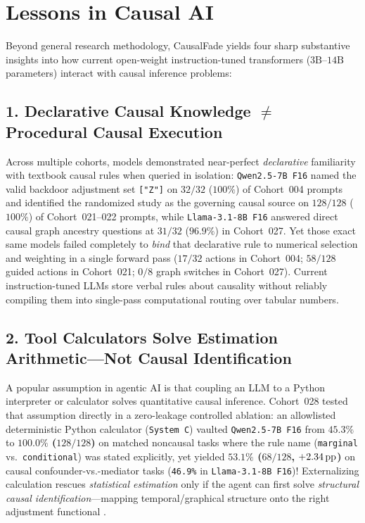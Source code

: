 \chapter{Lessons in Causal AI}\label{ch:lessons_causal_ai}

Beyond general research methodology, CausalFade yields four sharp substantive insights into how current open-weight instruction-tuned transformers ($3\text{B}$--$14\text{B}$ parameters) interact with causal inference problems:

\section{1. Declarative Causal Knowledge $\neq$ Procedural Causal Execution}
Across multiple cohorts, models demonstrated near-perfect \emph{declarative} familiarity with textbook causal rules when queried in isolation: \texttt{Qwen2.5-7B F16} named the valid backdoor adjustment set \texttt{["Z"]} on $32/32$ ($100\%$) of Cohort~004 prompts and identified the randomized study as the governing causal source on $128/128$ ($100\%$) of Cohort~021--022 prompts, while \texttt{Llama-3.1-8B F16} answered direct causal graph ancestry questions at $31/32$ ($96.9\%$) in Cohort~027. Yet those exact same models failed completely to \emph{bind} that declarative rule to numerical selection and weighting in a single forward pass ($17/32$ actions in Cohort~004; $58/128$ guided actions in Cohort~021; $0/8$ graph switches in Cohort~027). Current instruction-tuned LLMs store verbal rules about causality without reliably compiling them into single-pass computational routing over tabular numbers.

\section{2. Tool Calculators Solve Estimation Arithmetic---Not Causal Identification}
A popular assumption in agentic AI is that coupling an LLM to a Python interpreter or calculator solves quantitative causal inference. Cohort~028 tested that assumption directly in a zero-leakage controlled ablation: an allowlisted deterministic Python calculator (\texttt{System C}) vaulted \texttt{Qwen2.5-7B F16} from $45.3\%$ to \textbf{$100.0\%$ ($128/128$)} on matched noncausal tasks where the rule name (\texttt{marginal} vs.\ \texttt{conditional}) was stated explicitly, yet yielded \textbf{$53.1\%$ ($68/128$, $+2.34\,\mathrm{pp}$)} on causal confounder-vs.-mediator tasks (\texttt{46.9\%} in \texttt{Llama-3.1-8B F16})! Externalizing calculation rescues \emph{statistical estimation} only if the agent can first solve \emph{structural causal identification}---mapping temporal/graphical structure onto the right adjustment functional \citep{pearl2009causality,sawarni2026crb,leban2026causalds}.

